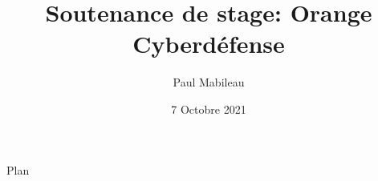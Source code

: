 \documentclass[french, a4paper]{beamer}
\title{Soutenance de stage: Orange Cyberdéfense}
\author{Paul Mabileau}
\institute{Télécom SudParis}
\date{7 Octobre 2021}
\begin{document}
\begin{frame}
    \titlepage{}
\end{frame}

\begin{frame}
    \begin{center}
        {\Large Plan }
    \end{center}
    \tableofcontents[subsubsectionstyle = hide]
\end{frame}
\end{document}
